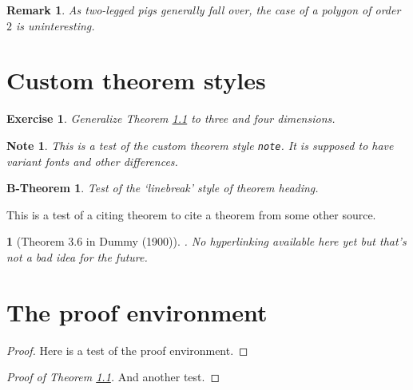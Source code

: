 \documentclass[
]{article}
\theoremstyle{plain}
\theoremstyle{plain}
\theoremstyle{plain}
\theoremstyle{plain}
\theoremstyle{plain}
\newtheorem*{remark}{Remark}
\theoremstyle{exercise}
\newtheorem{exercise}{Exercise}
\theoremstyle{note}
\newtheorem{note}{Note}
\theoremstyle{break}
\newtheorem{bthm}{B-Theorem}
\theoremstyle{citing}
\newtheorem*{varthm}{}
\theoremstyle{plain}
\begin{document}
\begin{remark}

As two-legged pigs generally fall over, the case of a polygon of order
\(2\) is uninteresting.

\end{remark}

\hypertarget{custom-theorem-styles}{%
\section{Custom theorem styles}\label{custom-theorem-styles}}

\begin{exercise}

Generalize Theorem \protect\hyperlink{sdq}{1.1} to three and four
dimensions.

\end{exercise}

\begin{note}

This is a test of the custom theorem style \texttt{note}. It is supposed
to have variant fonts and other differences.

\end{note}

\begin{bthm}

Test of the `linebreak' style of theorem heading.

\end{bthm}

This is a test of a citing theorem to cite a theorem from some other
source.

\begin{varthm}[Theorem 3.6 in Dummy (1900)]

. No hyperlinking available here yet but that's not a bad idea for the
future.

\end{varthm}

\hypertarget{the-proof-environment}{%
\section{The proof environment}\label{the-proof-environment}}

\begin{proof}

Here is a test of the proof environment.

\end{proof}

\begin{proof}[Proof of Theorem \protect\hyperlink{sdq}{1.1}]

And another test.

\end{proof}
\end{document}
